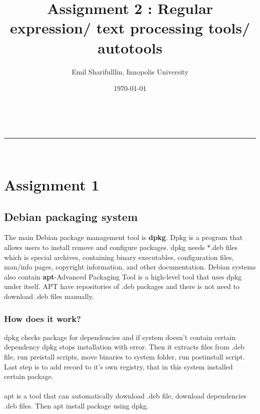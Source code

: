 \documentclass[a4paper,11pt]{article}
\makeatletter
\newcommand*{\TitleFont}{%
      \usefont{\encodingdefault}{\rmdefault}{b}{n}%
      \fontsize{16}{20}%
      \selectfont}
\renewcommand{\maketitle}{
\begin{center}
\vspace{2ex}
{\huge \textsc{\@title}}
\vspace{1ex}
\\
\rule{\linewidth}{0.5pt}\\
\@author \hfill \@date
\vspace{4ex}
\end{center}
}
\makeatother
\begin{document}







\title{ \TitleFont Assignment 2 : Regular expression/ text processing tools/ autotools }

\author{Emil Sharifulllin, Innopolis University}

\date{\today}

\maketitle

\section{Assignment 1}

\subsection{Debian packaging system}
The main Debian package management tool is \textbf{dpkg}. Dpkg is a program that allows users to install remove and configure packages. dpkg needs *.deb files which is special archives, containing binary executables, configuration files, man/info pages, copyright information, and other documentation. Debian systems also contain \textbf{apt}-Advanced Packaging Tool is a high-level tool that uses dpkg under itself. APT have repositories of .deb packages and there is not need to download .deb files manually.

\subsubsection{How does it work?}
dpkg checks package for dependencies and if system doesn't contain certain dependency dpkg stops installation with error. Then it extracts files from .deb file, run preistall scripts, move binaries to system folder, run postinstall script. Last step is to add record to it's own registry, that in this system installed certain package.\\\\
apt is a tool that can automatically download .deb file, download dependencies .deb files. Then apt install package using dpkg.
\end{document}
